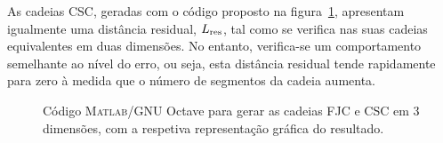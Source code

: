 As cadeias CSC, geradas com o código proposto na figura~\ref{fig:cadeias_3d}, apresentam igualmente uma distância residual, $L_{\mathrm{res}}$, tal como se verifica nas suas cadeias equivalentes em duas dimensões. No entanto, verifica-se um comportamento semelhante ao nível do erro, ou seja, esta distância residual tende rapidamente para zero à medida que o número de segmentos da cadeia aumenta. 
 
\begin{figure}[!t]
\centering

\caption[Código e representação gráfica de FJC e CSC em 3D]{Código \textsc{Matlab}\textsuperscript{\textregistered}/GNU Octave para gerar as cadeias FJC e CSC em 3 dimensões, com a respetiva representação gráfica do resultado.}
\label{fig:cadeias_3d}
\end{figure}

